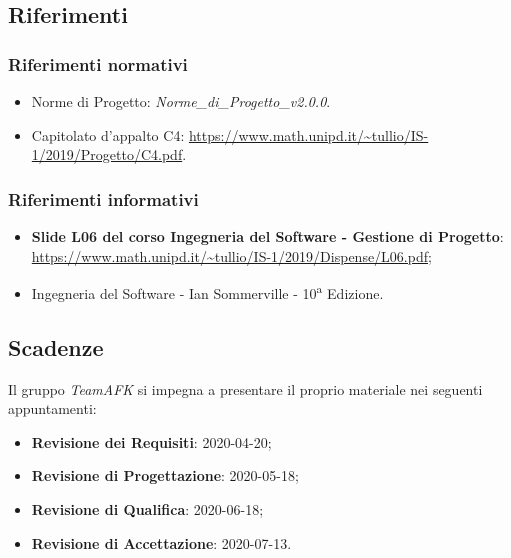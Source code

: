 \subsection{Riferimenti}
\subsubsection{Riferimenti normativi}
\begin{itemize}
	\item Norme di Progetto: \textit{Norme\_di\_Progetto\_v2.0.0}.
	\item Capitolato d'appalto C4: \url{https://www.math.unipd.it/~tullio/IS-1/2019/Progetto/C4.pdf}.
\end{itemize}
\subsubsection{Riferimenti informativi}
\begin{itemize}
	\item \textbf{Slide L06 del corso Ingegneria del Software - Gestione di Progetto}: \\
	\url{https://www.math.unipd.it/~tullio/IS-1/2019/Dispense/L06.pdf};
	\item Ingegneria del Software - Ian Sommerville - 10\textsuperscript{a} Edizione.
\end{itemize}
\subsection{Scadenze}
Il gruppo \textit{TeamAFK} si impegna a presentare il proprio materiale nei seguenti appuntamenti:\\
\begin{itemize}
\item \textbf{Revisione dei Requisiti}: 2020-04-20;
\item \textbf{Revisione di Progettazione}: 2020-05-18;
\item \textbf{Revisione di Qualifica}: 2020-06-18;
\item \textbf{Revisione di Accettazione}: 2020-07-13. 
\end{itemize}
